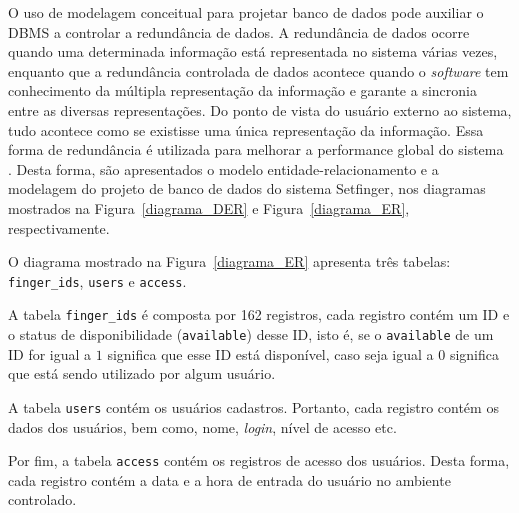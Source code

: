 

O uso de modelagem conceitual para projetar banco de dados pode auxiliar o DBMS a controlar a redundância de dados. A redundância de dados ocorre quando uma determinada informação está representada no sistema várias vezes, enquanto que a redundância controlada de dados acontece quando o \textit{software} tem conhecimento da múltipla representação da informação e garante a sincronia entre as diversas representações. Do ponto de vista do usuário externo ao sistema, tudo acontece como se existisse uma única representação da informação. Essa forma de redundância é utilizada para melhorar a performance global do sistema \cite{greenwald2007oracle, stephens2009sams}. Desta forma, são apresentados o modelo entidade-relacionamento e a modelagem do projeto de banco de dados do sistema Setfinger, nos diagramas mostrados na Figura~\ref{diagrama_DER} e Figura~\ref{diagrama_ER}, respectivamente.

\begin{sloppypar}
O diagrama mostrado na Figura~\ref{diagrama_ER} apresenta três tabelas: \texttt{finger\_ids}, \texttt{users} e \texttt{access}. 

A tabela \texttt{finger\_ids} é composta por 162 registros, cada registro contém um ID e o status de disponibilidade (\texttt{available}) desse ID, isto é, se o \texttt{available} de um ID for igual a $1$ significa que esse ID está disponível, caso seja igual a $0$ significa que está sendo utilizado por algum usuário. 

A tabela \texttt{users} contém os usuários cadastros. Portanto, cada registro contém os dados dos usuários, bem como, nome, \textit{login}, nível de acesso etc.

Por fim, a tabela \texttt{access} contém os registros de acesso dos usuários. Desta forma, cada registro contém a data e a hora de entrada do usuário no ambiente controlado.  



\end{sloppypar}

